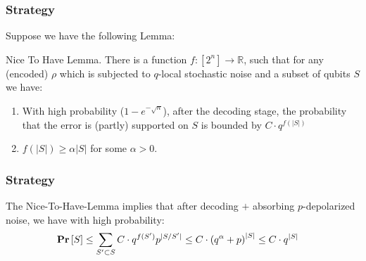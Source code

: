 \documentclass{beamer}
\begin{document}
\begin{frame}
  \frametitle{Strategy}
Suppose we have the following Lemma: 
\begin{block}{Nice To Have Lemma.} There is a function $f : [2^{n}] \rightarrow \mathbb{R}$, such that for any (encoded) $\rho$ which is subjected to $q$-local stochastic noise and a subset of qubits $S$ we have:  
    \begin{enumerate}
      \item With high probability ($1 - e^{-\sqrt{n}}$), after the decoding stage, the probability that the error is (partly) supported on $S$ is bounded by $C \cdot q^{f(|S|)}$
      \item $f(|S|) \ge \alpha|S|$ for some $\alpha > 0$. 
    \end{enumerate}
  \end{block}
\end{frame}

\begin{frame}
  \frametitle{Strategy}
  The Nice-To-Have-Lemma implies that after decoding $+$ absorbing $p$-depolarized noise, we have with high probability:  
  \begin{align*}
    \mathbf{Pr} \left[ S \right] &  \le \sum_{S^{\prime} \subset S }{C\cdot q^{f(S^{\prime}) }p^{|S /S^{\prime}|}  } \le C \cdot \left( q^{\alpha} + p \right)^{|S|} \le C \cdot q^{|S|}
  \end{align*}
\end{frame}
\end{document}
